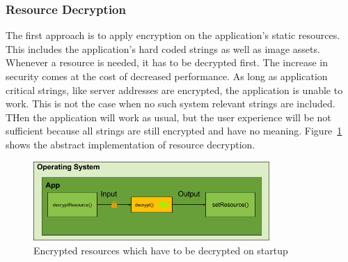 \subsubsection{Resource Decryption} \label{subsection:counter-replace-encryption-content-resource}
The first approach is to apply encryption on the application's static resources.
This includes the application's hard coded strings as well as image assets.
Whenever a resource is needed, it has to be decrypted first.
The increase in security comes at the cost of decreased performance.
As long as application critical strings, like server addresses are encrypted, the application is unable to work.
This is not the case when no such system relevant strings are included.
THen the application will work as usual, but the user experience will be not sufficient because all strings are still encrypted and have no meaning.
Figure~\ref{fig:encryptionResource} shows the abstract implementation of resource decryption.

\begin{figure}[h]
    \centering
    \includegraphics[width=0.8\textwidth]{data/encryptionResource.png}
    \caption{Encrypted resources which have to be decrypted on startup}
    \label{fig:encryptionResource}
\end{figure}
